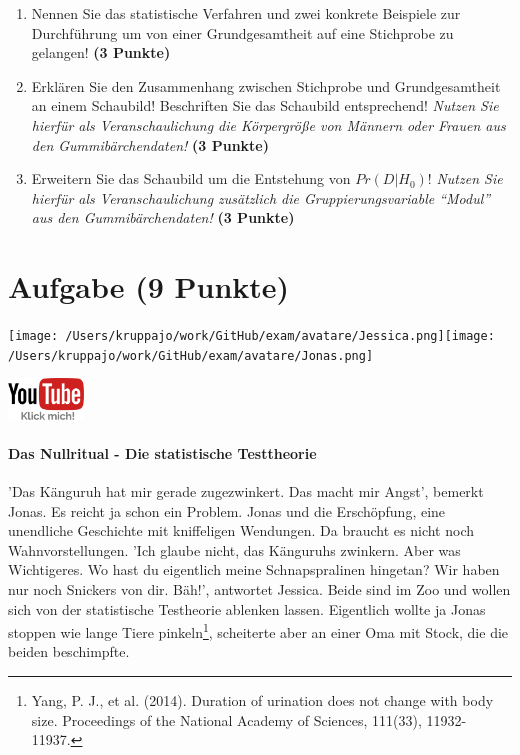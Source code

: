 \documentclass[a4paper, 9pt]{scrartcl}\usepackage[]{graphicx}\usepackage[]{xcolor}
\begin{document}
\begin{enumerate}
\item Nennen Sie das statistische Verfahren und zwei konkrete Beispiele zur Durchführung um von einer Grundgesamtheit auf eine Stichprobe zu gelangen! \textbf{(3 Punkte)}
\item Erklären Sie den Zusammenhang zwischen Stichprobe und Grundgesamtheit an einem Schaubild! Beschriften Sie das Schaubild entsprechend!
  \textit{Nutzen Sie hierfür als Veranschaulichung die Körpergröße von Männern oder Frauen aus den Gummibärchendaten!}  \textbf{(3 Punkte)}
\item Erweitern Sie das Schaubild um die Entstehung von $Pr(D|H_0)$! \textit{Nutzen Sie hierfür als Veranschaulichung zusätzlich die Gruppierungsvariable "`Modul"' aus den Gummibärchendaten!}  \textbf{(3 Punkte)}
\end{enumerate} 
\clearpage

\section{Aufgabe \hfill (9 Punkte)}


 
\begin{minipage}[t]{0.5\textwidth}
\texttt{[image: /Users/kruppajo/work/GitHub/exam/avatare/Jessica.png]}\hspace{-4mm}\texttt{[image: /Users/kruppajo/work/GitHub/exam/avatare/Jonas.png]}
\end{minipage}
\begin{minipage}[t]{0.5\textwidth}
\hfill
\href{https://youtu.be/Ric8ne39DtI}{\includegraphics[width = 2cm]{img/youtube}}
\end{minipage}



\paragraph{Das Nullritual - Die statistische Testtheorie}

'Das Känguruh hat mir gerade zugezwinkert. Das macht mir Angst', bemerkt Jonas. Es reicht ja schon ein Problem. Jonas und die Erschöpfung, eine unendliche Geschichte mit kniffeligen Wendungen. Da braucht es nicht noch Wahnvorstellungen. 'Ich glaube nicht, das Känguruhs zwinkern. Aber was Wichtigeres. Wo hast du eigentlich meine Schnapspralinen hingetan? Wir haben nur noch Snickers von dir. Bäh!', antwortet Jessica. Beide sind im Zoo und wollen sich von der statistische Testheorie ablenken lassen. Eigentlich wollte ja Jonas stoppen wie lange Tiere pinkeln\footnote{Yang, P. J., et al. (2014). Duration of urination does not change with body size. Proceedings of the National Academy of Sciences, 111(33), 11932-11937.}, scheiterte aber an einer Oma mit Stock, die die beiden beschimpfte.
\end{document}
